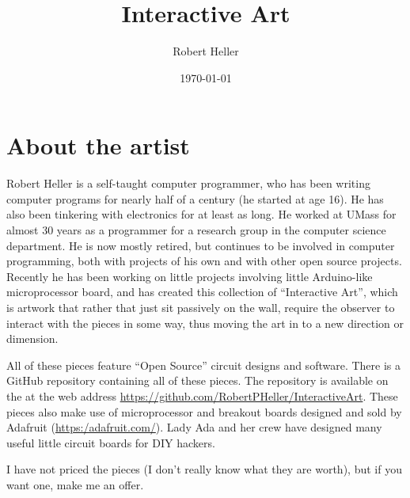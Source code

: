 \documentclass[12pt]{article}
\title{Interactive Art}
\author{Robert Heller}
\date{\today}
\begin{document}
\maketitle


\section*{About the artist}

Robert Heller is a self-taught computer programmer, who has been writing 
computer programs for nearly half of a century (he started at age 16).  He has 
also been tinkering with electronics for at least as long.  He worked at UMass 
for almost 30 years as a programmer for a research group in the computer 
science department.  He is now mostly retired, but continues to be involved in 
computer programming, both with projects of his own and with other open source 
projects.  Recently he has been working on little projects involving 
little Arduino-like microprocessor board, and has created this collection of 
``Interactive Art'', which is artwork that rather that just sit passively on 
the wall, require the observer to interact with the pieces in some way, thus 
moving the art in to a new direction or dimension.

All of these pieces feature ``Open Source'' circuit designs and software.
There is a GitHub repository containing all of these pieces. The repository is
available on the at the web address
\url{https://github.com/RobertPHeller/InteractiveArt}.
These pieces also make use of microprocessor and breakout boards designed and
sold by Adafruit
(\url{https:/adafruit.com/}). Lady
Ada and her crew have designed many useful little circuit boards for DIY
hackers.

I have not priced the pieces (I don't really know what they are worth), but if 
you want one, make me an offer.









%
\end{document}
